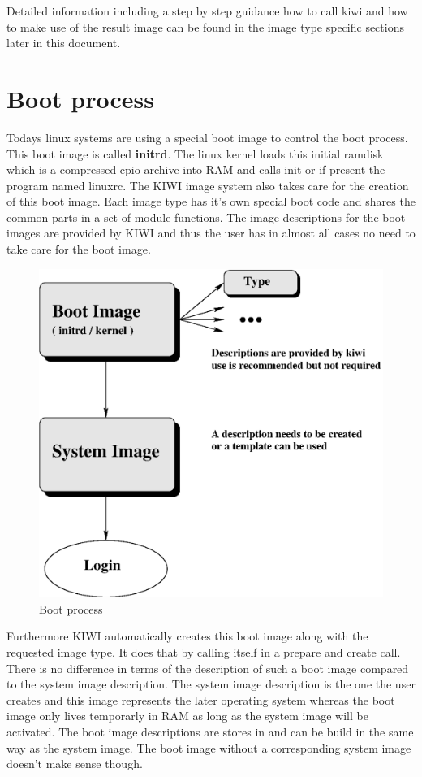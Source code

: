 Detailed information including a step by step guidance how to call
kiwi and how to make use of the result image can be found in the image
type specific sections later in this document.

\section{Boot process}
Todays linux systems are using a special boot image to control the
boot process. This boot image is called \textbf{initrd}. The linux
kernel loads this initial ramdisk which is a compressed cpio archive
into RAM and calls init or if present the program named linuxrc. The
KIWI image system also takes care for the creation of this boot image.
Each image type has it's own special boot code and shares the common
parts in a set of module functions. The image descriptions for the
boot images are provided by KIWI and thus the user has in almost all
cases no need to take care for the boot image.

\begin{figure}[h]
\centering
\includegraphics[scale=0.5]{pictures/activation.eps}
\caption{Boot process}
\label{fig:initrd}
\end{figure}

Furthermore KIWI automatically creates this boot image along with
the requested image type. It does that by calling itself in a prepare
and create call. There is no difference in terms of the description
of such a boot image compared to the system image description. The
system image description is the one the user creates and this image
represents the later operating system whereas the boot image only
lives temporarly in RAM as long as the system image will be activated.
The boot image descriptions are stores in 
and can be build in the same way as the system image. The boot image
without a corresponding system image doesn't make sense though.

